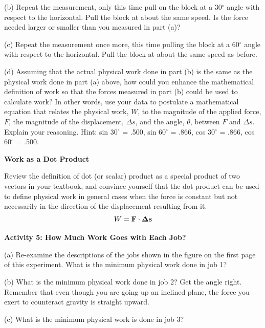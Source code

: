 \newpage
(b) Repeat the measurement, only this time pull on the block at a 30\( ^{\circ } \) angle with respect to the horizontal. Pull the block at about the same speed. Is the force needed larger or smaller than you measured in part (a)?
\vspace{20mm}

(c) Repeat the measurement once more, this time pulling the block at a 60\( ^{\circ } \) angle with respect to the horizontal.  Pull the block at about the same speed as before.
\vspace{20mm}

(d) Assuming that the actual physical work done in part (b) is the same as the
physical work done in part (a) above, how could you enhance the mathematical
definition of work so that the forces measured in part (b) could be used to
calculate work? In other words, use your data to postulate a mathematical equation
that relates the physical work, $W$, to the magnitude of the applied force, $F$,
the magnitude of the displacement, \( \Delta  s\), and the angle, \( \theta  \),
between $F$ and \( \Delta  s\). Explain your reasoning. Hint: sin 30\( ^{\circ } \)
= .500, sin 60\( ^{\circ } \) = .866, cos 30\( ^{\circ } \) = .866, cos 60\( ^{\circ } \)
= .500.
\vspace{30mm}

\textbf{Work as a Dot Product }

Review the definition of dot (or scalar) product as a special product of two
vectors in your textbook, and convince yourself that the dot product can be
used to define physical work in general cases when the force is constant but
not necessarily in the direction of the displacement resulting from it. 
\[W={\bf F}\cdot {\bf \Delta s}\]


\textbf{Activity 5: How Much Work Goes with Each Job? }

(a) Re-examine the descriptions of the jobs shown in the figure on the first
page of this experiment. What is the minimum physical work done in job 1?
\vspace{20mm}

(b) What is the minimum physical work done in job 2? Get the angle right. 
Remember that even though you are going up an inclined plane, the force you 
exert to counteract gravity is straight upward.
\vspace{25mm}


(c) What is the minimum physical work is done in job 3?
\vspace{25mm}


